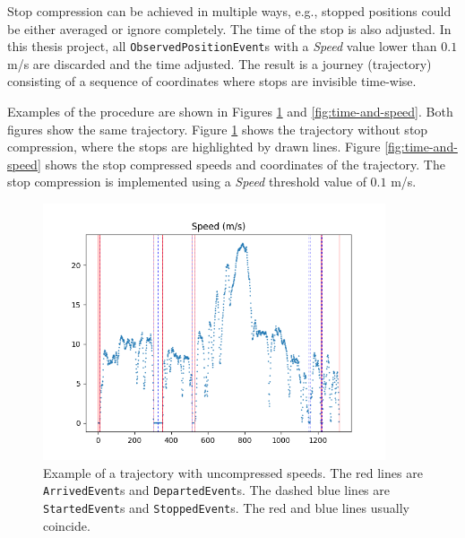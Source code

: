 Stop compression can be achieved in multiple ways, e.g., stopped positions could be either averaged or ignore completely.
The time of the stop is also adjusted.
In this thesis project, all \texttt{ObservedPositionEvent}s with a \textit{Speed} value lower than $0.1$ m/s are discarded and the time adjusted.
The result is a journey (trajectory) consisting of a sequence of coordinates where stops are invisible time-wise.

Examples of the procedure are shown in Figures \ref{fig:uncompressed-events} and \ref{fig:time-and-speed}.
Both figures show the same trajectory.
Figure \ref{fig:uncompressed-events} shows the trajectory without stop compression, where the stops are highlighted by drawn lines.
Figure \ref{fig:time-and-speed} shows the stop compressed speeds and coordinates of the trajectory.
The stop compression is implemented using a \textit{Speed} threshold value of $0.1$ m/s.

\begin{figure}[h!]
    \centering
    \includegraphics[width=0.9\textwidth]{figures/speed_and_stops_filter_0}
    \caption[Example of a trajectory with uncompressed speeds]
    {\small Example of a trajectory with uncompressed speeds.
    The red lines are \texttt{ArrivedEvent}s and \texttt{DepartedEvent}s.
    The dashed blue lines are \texttt{StartedEvent}s and \texttt{StoppedEvent}s.
    The red and blue lines usually coincide.}
    \label{fig:uncompressed-events}
\end{figure}

